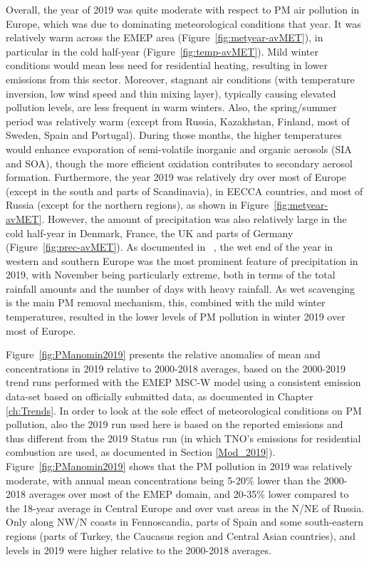 Overall, the year of 2019 was quite moderate with respect to PM air pollution in Europe, which was due to dominating meteorological conditions that year. It was relatively warm across the EMEP area (Figure~\ref{fig:metyear-avMET}), in particular in the cold half-year (Figure~\ref{fig:temp-avMET}). Mild winter conditions would mean less need for residential heating, resulting in lower emissions from this sector. Moreover, stagnant air conditions (with temperature inversion, low wind speed and thin mixing layer), typically causing elevated pollution levels, are less frequent in warm winters. Also, the spring/summer period was relatively warm (except from Russia, Kazakhstan, Finland, most of Sweden, Spain and Portugal). During those months, the higher temperatures would enhance evaporation of semi-volatile inorganic and organic aerosols (SIA and SOA), though the more efficient oxidation contributes to secondary aerosol formation. Furthermore, the year 2019 was relatively dry over most of Europe (except in the south and parts of Scandinavia), in EECCA countries, and most of Russia (except for the northern regions), as shown in Figure~\ref{fig:metyear-avMET}. However, the amount of precipitation was also relatively large in the cold half-year in Denmark, France, the UK and parts of Germany (Figure~\ref{fig:prec-avMET}). As documented in ~\citet{CAMS2020}, the wet end of the year in western and southern Europe was the most prominent feature of precipitation in 2019, with 
November being particularly extreme, both in terms of the total rainfall amounts and the number of days with heavy rainfall. As wet scavenging is the main PM removal mechanism, this, combined with the mild winter temperatures, resulted in the lower levels of PM pollution in winter 2019 over most of Europe.   

Figure~\ref{fig:PManomin2019} presents the relative anomalies of mean \PM[10] and \PM[2.5] concentrations in 2019 relative to 2000-2018 averages, based on the 2000-2019 trend runs performed with the EMEP MSC-W model using a consistent emission data-set based on officially submitted data, as documented in Chapter \ref{ch:Trends}. In order to look at the sole effect of meteorological conditions on PM pollution, also the 2019 run used here is based on the reported emissions and thus different from the 2019 Status run (in which TNO's emissions for residential combustion are used, as documented in Section \ref{Mod_2019}). Figure~\ref{fig:PManomin2019} shows that the PM pollution in 2019 was relatively moderate, with annual mean concentrations being 5-20\% lower than the 2000-2018 averages over most of the EMEP domain, and 20-35\% lower compared to the 18-year average in Central Europe and over vast areas in the N/NE of Russia. Only along NW/N coasts in Fennoscandia, parts of Spain and some south-eastern regions (parts of Turkey, the Caucasus region and Central Asian countries), \PM[10] and \PM[2.5] levels in 2019 were higher relative to the 2000-2018 averages. 


